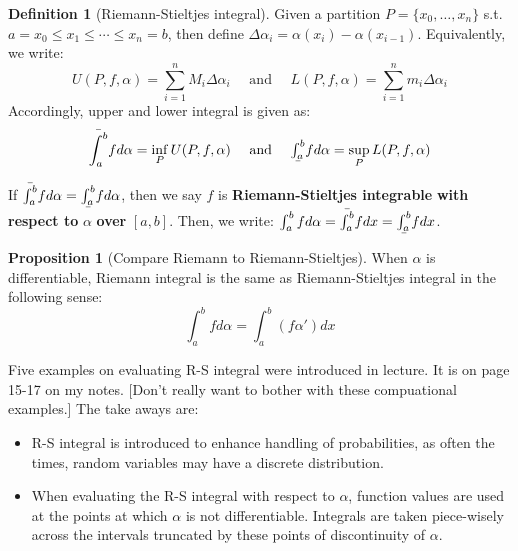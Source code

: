 \documentclass[12pt]{article}
\theoremstyle{definition}
\newtheorem{definition}[theorem]{Definition}
\newtheorem{proposition}[theorem]{Proposition}
\theoremstyle{plain}
\newcommand\barbelow[1]{\stackunder[1.2pt]{$#1$}{\rule{.8ex}{.075ex}}}
\begin{document}
\begin{definition}
    [Riemann-Stieltjes integral]
    Given a partition $P = \{ x_0, \ldots, x_n\}$ s.t. $a = x_0 \le x_1 \le
    \cdots \le x_n = b$, then define $\Delta \alpha _i = \alpha(x_i) -
    \alpha(x_{i-1})$. Equivalently, we write:
    \[
        U(P,f,\alpha) = \sum_{i=1}^n M_i \Delta \alpha_i
        \quad \text{ and } \quad
        L(P,f,\alpha) = \sum_{i=1}^n m_i \Delta \alpha_i
    \]
    Accordingly, upper and lower integral is given as:
    \[
        \bar{\int_a^b} f d\alpha = \inf_P U(P,f, \alpha)
        \quad \text{ and } \quad
        \barbelow{\int_a^b} f d\alpha = \sup_P L(P,f,\alpha)
    \]

    If $ \bar{\int_a^b} f d\alpha  = \barbelow{\int_a^b} f d\alpha$, then we say
    $f$ is \textbf{Riemann-Stieltjes integrable} \textbf{with respect to}
    $\alpha$ \textbf{over} $[a,b]$. Then, we write:
    $\int_a^b f d\alpha  =
    \bar{\int_a^b} f dx = \barbelow{\int_a^b} fdx$.
\end{definition}

\begin{proposition}
    [Compare Riemann to Riemann-Stieltjes]
    When $\alpha$ is differentiable, Riemann integral is the same as
    Riemann-Stieltjes integral in the following sense:
    \[
        \int_a^b f d\alpha = \int_a^b \left( f \alpha' \right)d x
    \]
\end{proposition}

\begin{example}
    Five examples on evaluating R-S integral were introduced in lecture. It is
    on page 15-17 on my notes. [Don't really want to bother with these
    compuational examples.] The take aways are:

    \begin{itemize}
        \item R-S integral is introduced to enhance handling of probabilities,
            as often the times, random variables may have a discrete
            distribution.
        \item When evaluating the R-S integral with respect to $\alpha$,
            function values are used at the points at which $\alpha$ is
                not differentiable. Integrals are taken piece-wisely across the
                intervals truncated by these points of discontinuity of
                $\alpha$.
    \end{itemize}
\end{example}
\end{document}
